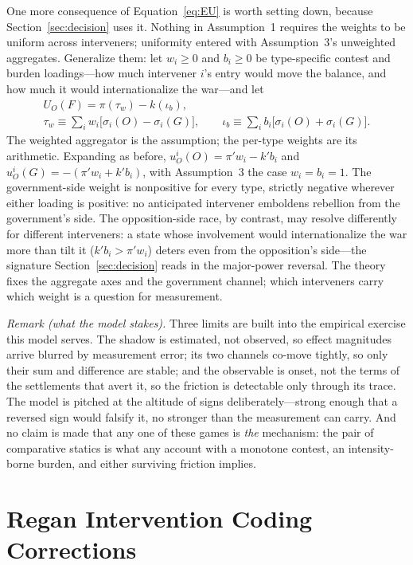 One more consequence of Equation~\eqref{eq:EU} is worth setting down, because
Section~\ref{sec:decision} uses it.  Nothing in Assumption~1 requires the
weights to be uniform across interveners; uniformity entered with
Assumption~3's unweighted aggregates.  Generalize them: let $w_i \ge 0$ and
$b_i \ge 0$ be type-specific contest and burden loadings---how much
intervener $i$'s entry would move the balance, and how much it would
internationalize the war---and let
\begin{gather*}
  U_O(F) = \pi(\tau_w) - k(\iota_b), \\
  \tau_w \equiv \sum_i w_i\bigl[\sigma_i(O) - \sigma_i(G)\bigr], \qquad
  \iota_b \equiv \sum_i b_i\bigl[\sigma_i(O) + \sigma_i(G)\bigr].
\end{gather*}
The weighted aggregator is the assumption; the per-type weights are its
arithmetic.  Expanding as before, $u_O^i(O) = \pi' w_i - k' b_i$ and
$u_O^i(G) = -(\pi' w_i + k' b_i)$, with Assumption~3 the case $w_i = b_i =
1$.  The government-side weight is nonpositive for every type, strictly
negative wherever either loading is positive: no anticipated intervener
emboldens rebellion from the government's side.  The opposition-side race, by
contrast, may resolve differently for different interveners: a state whose
involvement would internationalize the war more than tilt it ($k' b_i > \pi'
w_i$) deters even from the opposition's side---the signature
Section~\ref{sec:decision} reads in the major-power reversal.  The theory
fixes the aggregate axes and the government channel; which interveners carry
which weight is a question for measurement.

\emph{Remark (what the model stakes).}  Three limits are built into the
empirical exercise this model serves.  The shadow is estimated, not observed,
so effect magnitudes arrive blurred by measurement error; its two channels
co-move tightly, so only their sum and difference are stable; and the
observable is onset, not the terms of the settlements that avert it, so the
friction is detectable only through its trace.  The model is pitched at the
altitude of signs deliberately---strong enough that a reversed sign would
falsify it, no stronger than the measurement can carry.  And no claim is made
that any one of these games is \emph{the} mechanism: the pair of comparative
statics is what any account with a monotone contest, an intensity-borne
burden, and either surviving friction implies.

\section{Regan Intervention Coding Corrections}
\label{app:coding}

